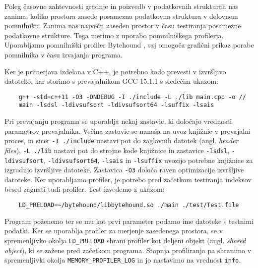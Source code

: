 Poleg časovne zahtevnosti gradnje in poizvedb v podatkovnih strukturah nas zanima, koliko prostora zasede posamezna podatkovna struktura v delovnem pomnilniku. Zanima nas največji zaseden prostor v času testiranja posamezne podatkovne strukture. Tega merimo z uporabo pomnilniškega profilerja. Uporabljamo pomnilniški profiler Bytehound \cite{Bytehound2024}, saj omogoča grafični prikaz porabe pomnilnika v času izvajanja programa.

Ker je primerjava izdelana v C++, je potrebno kodo prevesti v izvršljivo datoteko, kar storimo s prevajalnikom GCC 15.1.1 s sledečim ukazom:
\begin{lstlisting}
    g++ -std=c++11 -O3 -DNDEBUG -I ./include -L ./lib main.cpp -o //
    main -lsdsl -ldivsufsort -ldivsufsort64 -lsuffix -lsais
\end{lstlisting}
Pri prevajanju programa se uporablja nekaj zastavic, ki določajo vrednosti parametrov prevajalnika. Večina zastavic se nanaša na uvoz knjižnic v prevajalni proces, in sicer \verb|-I ./include| nastavi pot do zaglavnih datotek (angl. \textit{header files}), \verb|-L ./lib| nastavi pot do strojne kode knjižnice in zastavice \verb|-lsdsl|, \verb|-ldivsufsort|, \verb|-ldivsufsort64|,  \verb|-lsais| in \verb|-lsuffix| uvozijo potrebne knjižnice za izgradnjo izvršljive datoteke.
Zastavica \verb|-O3| določa raven optimizacije izvršljive datoteke. Ker uporabljamo profiler, je potrebo pred začetkom testiranja indeksov besed zagnati tudi profiler. Test izvedemo z ukazom:
\begin{lstlisting}
    LD_PRELOAD=~/bytehound/libbytehound.so ./main ./test/Test.file 
\end{lstlisting}
Program poženemo ter se mu kot prvi parameter podamo ime datoteke s testnimi podatki. Ker se uporablja profiler za merjenje zasedenega prostora, se v spremenljivko okolja \verb|LD_PRELOAD| shrani profiler kot deljeni objekt (angl. \textit{shared object}), ki se zažene pred začetkom programa. Stopnja profiliranja pa shranimo v spremenljivki okolja \verb|MEMORY_PROFILER_LOG| in jo nastavimo na vrednost \verb|info|.





